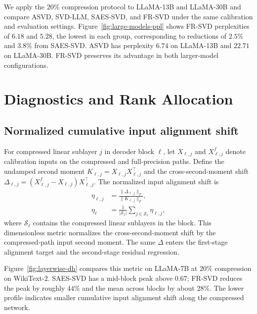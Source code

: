 We apply the $20\%$ compression protocol to LLaMA-13B and LLaMA-30B and compare ASVD, SVD-LLM, SAES-SVD, and FR-SVD under the same calibration and evaluation settings. Figure~\ref{fig:large-models-ppl} shows FR-SVD perplexities of $6.18$ and $5.28$, the lowest in each group, corresponding to reductions of $2.5\%$ and $3.8\%$ from SAES-SVD. ASVD has perplexity $6.74$ on LLaMA-13B and $22.71$ on LLaMA-30B. FR-SVD preserves its advantage in both larger-model configurations.



\section{Diagnostics and Rank Allocation}\label{app:diagnostics}

\subsection{Normalized cumulative input alignment shift}\label{app:input-shift}
For compressed linear sublayer $j$ in decoder block $\ell$, let $X_{\ell,j}$ and $X_{\ell,j}^f$ denote calibration inputs on the compressed and full-precision paths. Define the undamped second moment $K_{\ell,j}=X_{\ell,j}X_{\ell,j}^\top$ and the cross-second-moment shift $\Delta_{\ell,j}=(X_{\ell,j}^f-X_{\ell,j})X_{\ell,j}^\top$. The normalized input alignment shift is
\begin{equation}
\begin{aligned}
\eta_{\ell,j}&=\frac{\|\Delta_{\ell,j}\|_F}{\|K_{\ell,j}\|_F},\\
\eta_\ell&=\frac1{|\mathcal S_\ell|}\sum_{j\in\mathcal S_\ell}\eta_{\ell,j},
\end{aligned}
\label{eq:app-input-shift}
\end{equation}
where $\mathcal S_\ell$ contains the compressed linear sublayers in the block. This dimensionless metric normalizes the cross-second-moment shift by the compressed-path input second moment. The same $\Delta$ enters the first-stage alignment target and the second-stage residual regression.

Figure~\ref{fig:layerwise-dh} compares this metric on LLaMA-7B at $20\%$ compression on WikiText-2. SAES-SVD has a mid-block peak above $0.67$; FR-SVD reduces the peak by roughly $44\%$ and the mean across blocks by about $28\%$. The lower profile indicates smaller cumulative input alignment shift along the compressed network.

